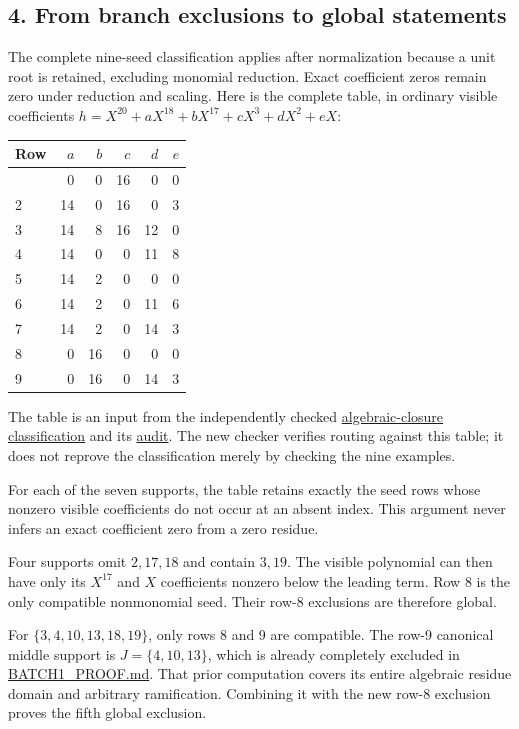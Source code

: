 \documentclass[
  british,
  10pt,
]{article}
\newcounter{none} %
\begin{document}
\subsection{4. From branch exclusions to global
statements}\label{from-branch-exclusions-to-global-statements}

The complete nine-seed classification applies after normalization
because a unit root is retained, excluding monomial reduction. Exact
coefficient zeros remain zero under reduction and scaling. Here is the
complete table, in ordinary visible coefficients
\(h=X^{20}+aX^{18}+bX^{17}+cX^3+dX^2+eX\):

{\def\LTcaptype{none} %
\begin{longtable}[]{@{}lrrrrr@{}}
\toprule\noalign{}
Row & \(a\) & \(b\) & \(c\) & \(d\) & \(e\) \\
\midrule\noalign{}
\endhead
\bottomrule\noalign{}
\endlastfoot
1 & 0 & 0 & 16 & 0 & 0 \\
2 & 14 & 0 & 16 & 0 & 3 \\
3 & 14 & 8 & 16 & 12 & 0 \\
4 & 14 & 0 & 0 & 11 & 8 \\
5 & 14 & 2 & 0 & 0 & 0 \\
6 & 14 & 2 & 0 & 11 & 6 \\
7 & 14 & 2 & 0 & 14 & 3 \\
8 & 0 & 16 & 0 & 0 & 0 \\
9 & 0 & 16 & 0 & 14 & 3 \\
\end{longtable}
}

The table is an input from the independently checked
\href{evidence/full/support_frontier/prime17/CLASSIFICATION.md}{algebraic-closure
classification} and its
\href{evidence/full/literature/PRIME17_CLASSIFICATION_AUDIT.md}{audit}.
The new checker verifies routing against this table; it does not reprove
the classification merely by checking the nine examples.

For each of the seven supports, the table retains exactly the seed rows
whose nonzero visible coefficients do not occur at an absent index. This
argument never infers an exact coefficient zero from a zero residue.

Four supports omit \(2,17,18\) and contain \(3,19\). The visible
polynomial can then have only its \(X^{17}\) and \(X\) coefficients
nonzero below the leading term. Row 8 is the only compatible nonmonomial
seed. Their row-8 exclusions are therefore global.

For \(\{3,4,10,13,18,19\}\), only rows 8 and 9 are compatible. The row-9
canonical middle support is \(J=\{4,10,13\}\), which is already
completely excluded in
\href{evidence/full/collective17/exclusions/BATCH1_PROOF.md}{BATCH1\_PROOF.md}.
That prior computation covers its entire algebraic residue domain and
arbitrary ramification. Combining it with the new row-8 exclusion proves
the fifth global exclusion.
\end{document}

